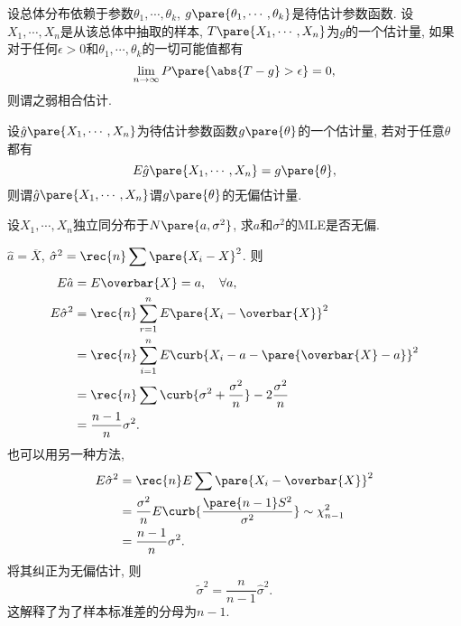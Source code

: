 \documentclass[../Statistics.tex]{subfiles}
\begin{document}
设总体分布依赖于参数$\theta_1,\cdots,\theta_k$, $g\pare{\theta_1,\cdots,\theta_k}$是待估计参数函数. 设$X_1,\cdots,X_n$是从该总体中抽取的样本, $T\pare{X_1,\cdots,X_n}$为$g$的一个估计量, 如果对于任何$\epsilon>0$和$\theta_1,\cdots,\theta_k$的一切可能值都有
\[ \lim_{n\rightarrow \infty} P\pare{\abs{T-g}>\epsilon} = 0, \]
则谓之弱相合估计.
\par
设$\hat{g}\pare{X_1,\cdots,X_n}$为待估计参数函数$g\pare{\theta}$的一个估计量, 若对于任意$\theta$都有
\[ E\hat{g}\pare{X_1,\cdots,X_n} = g\pare{\theta}, \]
则谓$\hat{g}\pare{X_1,\cdots,X_n}$谓$g\pare{\theta}$的无偏估计量.
\begin{sample}
    \begin{ex}
        设$X_1,\cdots,X_n$独立同分布于$N\pare{a,\sigma^2}$, 求$a$和$\sigma^2$的MLE是否无偏.
    \end{ex}
    \begin{solution}
        $\hat{a} = \overbar{X}$, $\hat\sigma^2 = \displaystyle \rec{n} \sum \pare{X_i - X}^2$. 则
        \begin{align*}
            E\hat{a} &= E\overbar{X} = a,\quad \forall a, \\
            E\hat\sigma^2 &= \rec{n} \sum_{r=1}^n E\pare{X_i - \overbar{X}}^2 \\
            &= \rec{n} \sum_{i=1}^n E\curb{X_i - a - \pare{\overbar{X} - a}}^2 \\
            &= \rec{n} \sum \curb{\sigma^2 + \frac{\sigma^2}{n}} - 2 \frac{\sigma^2}{n} \\
            &= \frac{n-1}{n}\sigma^2.
        \end{align*}
        也可以用另一种方法,
        \begin{align*}
            E\hat{\sigma}^2 &= \rec{n} E\sum \pare{X_i - \overbar{X}}^2 \\
            &= \frac{\sigma^2}{n} E\curb{\frac{\pare{n-1}S^2}{\sigma^2}}\sim \chi_{n-1}^2 \\
            &= \frac{n-1}{n}\sigma^2.
        \end{align*}
        将其纠正为无偏估计, 则
        \[ \tilde{\sigma}^2 = \frac{n}{n-1} \hat{\sigma}^2. \]
        这解释了为了样本标准差的分母为$n-1$.
    \end{solution}
\end{sample}
\end{document}
